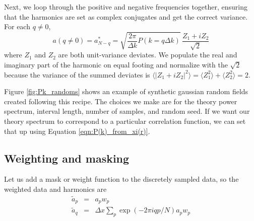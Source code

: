 Next, we loop through the positive and negative frequencies together, ensuring that the harmonics are set as complex conjugates and get the correct variance.  For each $q \neq 0$, 
\begin{equation}
  a({q\neq 0}) =  a^*_{N-q} = \sqrt{\frac{2\pi}{\Delta k } P(k = q \Delta k)}\, \frac{Z_1 + i Z_2}{\sqrt{2}} \label{eq:harmonic_synthesis}
\end{equation}
where $Z_1$ and $Z_2$ are both unit-variance deviates.  We populate the real and imaginary part of the harmonic on equal footing and normalize with the $\sqrt{2}$ because the variance of the summed deviates is $\langle |Z_1 + i Z_2 |^2 \rangle = \langle Z_1^2\rangle + \langle Z_2^2  \rangle = 2$.


Figure \ref{fig:Pk_randoms} shows an example of synthetic gaussian random fields created following this recipe.  The choices we make are for the theory power spectrum, interval length, number of samples, and random seed.  If we want our theory spectrum to correspond to a particular correlation function, we can set that up using Equation \ref{eqn:P(k)_from_xi(r)}.




\subsection{Weighting and masking}

 Let us add a mask or weight function to the discretely sampled data, so the weighted data and harmonics are
 \begin{eqnarray}
   \tilde a_p &=& a_p w_p \\
   \tilde a_q &=& \Delta x \sum_p \exp(-2\pi i qp/N) a_p w_p
 \end{eqnarray}

